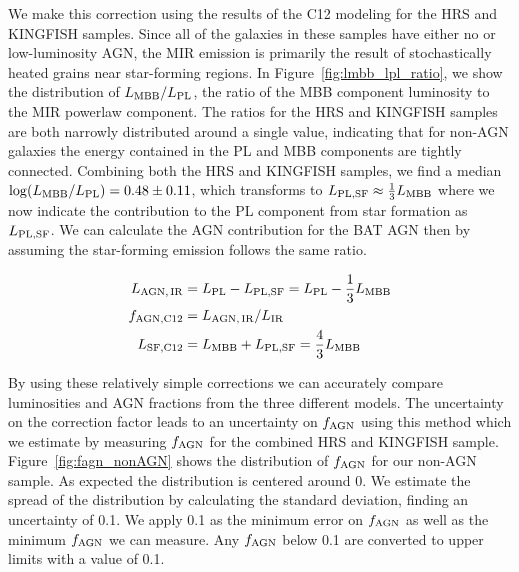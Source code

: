 \documentclass[fleqn, usenatbib]{mnras}
\begin{document}
We make this correction using the results of the C12 modeling for the HRS and KINGFISH samples. Since all of the galaxies in these samples have either no or low-luminosity AGN, the MIR emission is primarily the result of stochastically heated grains near star-forming regions. In Figure~\ref{fig:lmbb_lpl_ratio}, we show the distribution of $L_{\rm MBB}/L_{\rm PL}$, the ratio of the MBB component luminosity to the MIR powerlaw component. The ratios for the HRS and KINGFISH samples are both narrowly distributed around a single value, indicating that for non-AGN galaxies the energy contained in the PL and MBB components are tightly connected. Combining both the HRS and KINGFISH samples, we find a median $\log(L_{\rm MBB}/L_{\rm PL})=0.48 \pm 0.11$, which transforms to $L_{\rm PL,SF} \approx \frac{1}{3}L_{\rm MBB}$ where we now indicate the contribution to the PL component from star formation as  $L_{\rm PL,SF}$. We can calculate the AGN contribution for the BAT AGN then by assuming the star-forming emission follows the same ratio.

\begin{align}
L_{\rm AGN,\,IR} &= L_{\rm PL} - L_{\rm PL, SF} = L_{\rm PL} - \frac{1}{3}L_{\rm MBB} \label{eq:c12_lagnIR} \\
f_{\rm AGN, C12} &= L_{\rm AGN, \, IR}/L_{\rm IR} \label{eq:c12_fagn} \\
L_{\rm SF, C12} &= L_{\rm MBB} + L_{\rm PL,SF} =  \frac{4}{3}L_{\rm MBB} \label{eq:c12_lsf}
\end{align}

By using these relatively simple corrections we can accurately compare luminosities and AGN fractions from the three different models. The uncertainty on the correction factor leads to an uncertainty on $f_{\rm AGN}$ using this method which we estimate by measuring $f_{\rm AGN}$ for the combined HRS and KINGFISH sample. Figure~\ref{fig:fagn_nonAGN} shows the distribution of $f_{\rm AGN}$ for our non-AGN sample. As expected the distribution is centered around 0. We estimate the spread of the distribution by calculating the standard deviation, finding an uncertainty of 0.1. We apply 0.1 as the minimum error on $f_{\rm AGN}$  as well as the minimum $f_{\rm AGN}$ we can measure. Any $f_{\rm AGN}$ below 0.1 are converted to upper limits with a value of 0.1.
\end{document}
